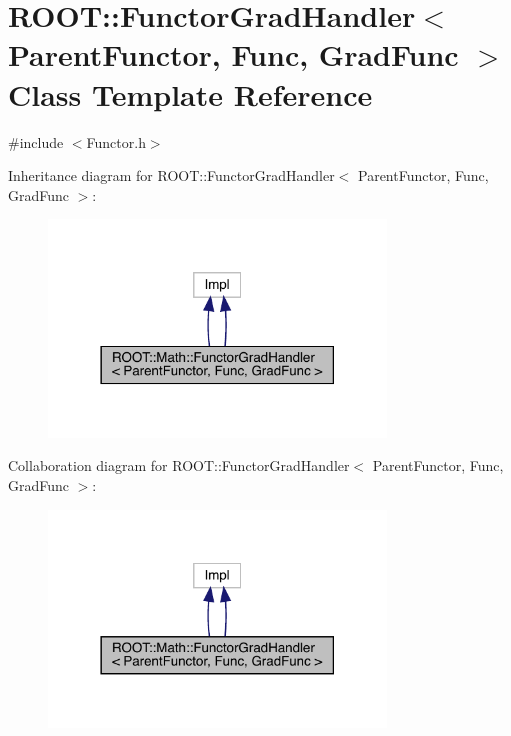 \hypertarget{classROOT_1_1Math_1_1FunctorGradHandler}{}\section{R\+O\+OT\+:\+:Functor\+Grad\+Handler$<$ Parent\+Functor, Func, Grad\+Func $>$ Class Template Reference}
\label{classROOT_1_1Math_1_1FunctorGradHandler}


{\ttfamily \#include $<$Functor.\+h$>$}



Inheritance diagram for R\+O\+OT\+:\+:Functor\+Grad\+Handler$<$ Parent\+Functor, Func, Grad\+Func $>$\+:\nopagebreak
\begin{figure}[H]
\begin{center}
\leavevmode
\includegraphics[width=254pt]{dd/dcc/classROOT_1_1Math_1_1FunctorGradHandler__inherit__graph}
\end{center}
\end{figure}


Collaboration diagram for R\+O\+OT\+:\+:Functor\+Grad\+Handler$<$ Parent\+Functor, Func, Grad\+Func $>$\+:\nopagebreak
\begin{figure}[H]
\begin{center}
\leavevmode
\includegraphics[width=254pt]{df/d09/classROOT_1_1Math_1_1FunctorGradHandler__coll__graph}
\end{center}
\end{figure}
